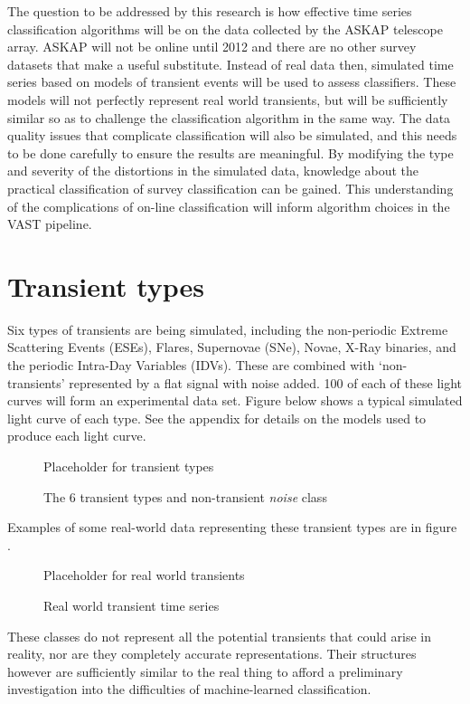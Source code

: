 		The question to be addressed by this research is how effective time series classification algorithms will be on the data collected by the ASKAP telescope array. ASKAP will not be online until 2012 and there are no other survey datasets that make a useful substitute. Instead of real data then, simulated time series based on models of transient events will be used to assess classifiers. These models will not perfectly represent real world transients, but will be sufficiently similar so as to challenge the classification algorithm in the same way. The data quality issues that complicate classification will also be simulated, and this needs to be done carefully to ensure the results are meaningful. By modifying the type and severity of the distortions in the simulated data, knowledge about the practical classification of survey classification can be gained. This understanding of the complications of on-line classification will inform algorithm choices in the VAST pipeline. %
	
	\section{Transient types}
		Six types of transients are being simulated, including the non-periodic Extreme Scattering Events (ESEs), Flares, Supernovae (SNe), Novae, X-Ray binaries,  and the periodic Intra-Day Variables (IDVs). These are combined with `non-transients' represented by a flat signal with noise added. 100 of each of these light curves will form an experimental data set. Figure below shows a typical simulated light curve of each type. See the appendix for details on the models used to produce each light curve. %
	
	\begin{figure}[ht!]
		\centering
		Placeholder for transient types
		\caption{The 6 transient types and non-transient \emph{noise} class}
	\end{figure}
	
	Examples of some real-world data representing these transient types are in figure . %
	
	\begin{figure}[ht!]
		\centering
		Placeholder for real world transients
		\caption{Real world transient time series}
	\end{figure}
	
	These classes do not represent all the potential transients that could arise in reality, nor are they completely accurate representations. Their structures however are sufficiently similar to the real thing to  afford a preliminary investigation into the difficulties of machine-learned classification.
		
